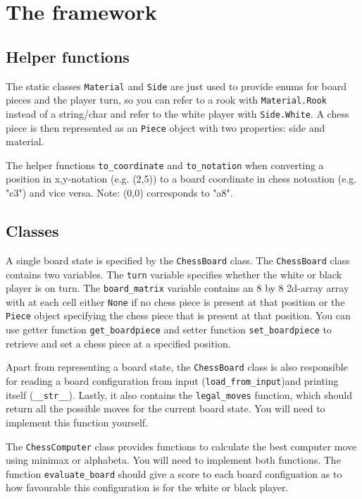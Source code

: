 \documentclass[10pt]{scrartcl}
\begin{document}
\section*{The framework}
\subsection*{Helper functions}
The static classes \texttt{Material} and \texttt{Side} are just used to provide enums for board pieces and the player turn, so you can refer to a rook with \texttt{Material.Rook} instead of a string/char and refer to the white player with \texttt{Side.White}. A chess piece is then represented as an \texttt{Piece} object with two properties: side and material.

The helper functions \texttt{to\_coordinate} and \texttt{to\_notation} when converting a position in x,y-notation (e.g. (2,5)) to a board coordinate in chess notoation (e.g. "c3") and vice versa. Note: (0,0) corresponds to "a8".

\subsection*{Classes}
A single board state is specified by the \texttt{ChessBoard} class. The \texttt{ChessBoard} class contains two variables. The \texttt{turn} variable specifies whether the white or black player is on turn. The \texttt{board\_matrix} variable contains an 8 by 8 2d-array array with at each cell either \texttt{None} if no chess piece is present at that position or the \texttt{Piece} object specifying the chess piece that is present at that position. You can use getter function \texttt{get\_boardpiece} and setter function \texttt{set\_boardpiece} to retrieve and set a chess piece at a specified position.

Apart from representing a board state, the \texttt{ChessBoard} class is also responsible for reading a board configuration from input (\texttt{load\_from\_input})and printing itself (\texttt{\_\_str\_\_}). Lastly, it also contains the \texttt{legal\_moves} function, which should return all the possible moves for the current board state. You will need to implement this function yourself.

The \texttt{ChessComputer} class provides functions to calculate the best computer move using minimax or alphabeta. You will need to implement both functions. The function \texttt{evaluate\_board} should give a score to each board configuation as to how favourable this configuration is for the white or black player.
\end{document}

